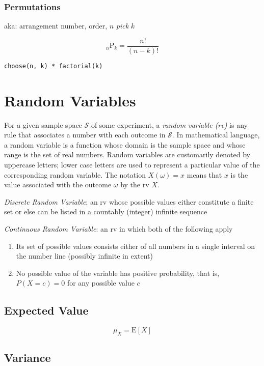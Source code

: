 \documentclass{article}
\begin{document}
\subsubsection*{Permutations}
aka: arrangement number, order, $n$ \textit{pick} $k$

$$ {}_n \mathrm{P}_k = \frac{n!}{(n-k)!} $$

\begin{lstlisting}
choose(n, k) * factorial(k)
\end{lstlisting}

\section*{Random Variables}
For a given sample space $\mathcal{S}$ of some experiment, a \textit{random variable (rv)} is any rule that associates a number with each outcome in $\mathcal{S}$. In mathematical language, a random variable is a function whose domain is the sample space and whose range is the set of real numbers.
Random variables are customarily denoted by uppercase letters; lower case letters are used to represent a particular value of the corresponding random variable.
The notation $X(\omega) = x$ means that $x$ is the value associated with the outcome $\omega$ by the rv $X$.

\vspace{1em}
\textit{Discrete Random Variable}: an rv whose possible values either constitute a finite set or else can be listed in a countably (integer) infinite sequence

\textit{Continuous Random Variable}: an rv in which both of the following apply
\begin{enumerate}
    \item Its set of possible values consists either of all numbers in a single interval on the number line (possibly infinite in extent)
    \item No possible value of the variable has positive probability, that is, $P(X=c)=0$ for any possible value $c$
\end{enumerate}

\subsection*{Expected Value}
$$ \mu_X = \mathrm{E}[X] $$

\subsection*{Variance}
\end{document}
